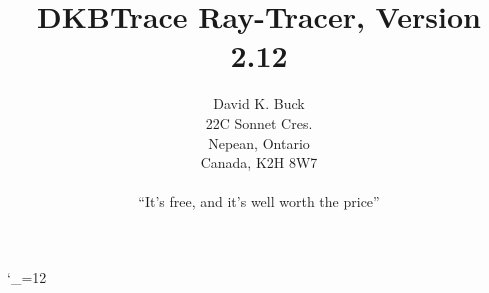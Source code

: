 

\newcommand{\optdefindex}[2]{\optindex{#1}\index{#2|see{{\tt #1} option}}}
\newcommand{\optindex}[1]{\index{#1@{\tt #1} option}\index{command-line options!#1@{\tt #1} option}}
\newcommand{\keyindex}[1]{\index{#1@{\tt #1} keyword}}
\newcommand{\ttindex}[1]{\index{#1@{\tt #1}}}
\newcommand{\emindex}[1]{\index{#1@{\em #1}}}
\newcommand{\see}[2]{{\em see\/} #1}
\makeindex

\setcounter{secnumdepth}{3}
\setcounter{tocdepth}{3}


\catcode`\_=12

\title{DKBTrace Ray-Tracer, Version 2.12}
\author{David K. Buck \\
22C Sonnet Cres. \\
Nepean, Ontario \\
Canada, K2H 8W7 \\
\\
``It's free, and it's well worth the price''}
\maketitle

\tableofcontents
\listoffigures
\clearpage
{}























